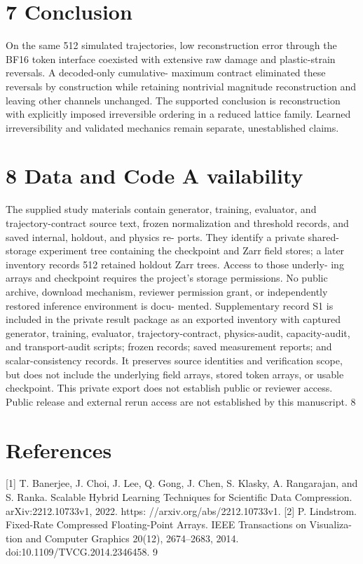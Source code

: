 \documentclass[11pt]{article}
\begin{document}
\section*{7 Conclusion}

On the same 512 simulated trajectories, low reconstruction error through the BF16 token interface
coexisted with extensive raw damage and plastic-strain reversals. A decoded-only cumulative-
maximum contract eliminated these reversals by construction while retaining nontrivial magnitude
reconstruction and leaving other channels unchanged. The supported conclusion is reconstruction
with explicitly imposed irreversible ordering in a reduced lattice family. Learned irreversibility and
validated mechanics remain separate, unestablished claims.

\section*{8 Data and Code A vailability}

The supplied study materials contain generator, training, evaluator, and trajectory-contract source
text, frozen normalization and threshold records, and saved internal, holdout, and physics re-
ports. They identify a private shared-storage experiment tree containing the checkpoint and Zarr
field stores; a later inventory records 512 retained holdout Zarr trees. Access to those underly-
ing arrays and checkpoint requires the project’s storage permissions. No public archive, download
mechanism, reviewer permission grant, or independently restored inference environment is docu-
mented. Supplementary record S1 is included in the private result package as an exported inventory
with captured generator, training, evaluator, trajectory-contract, physics-audit, capacity-audit, and
transport-audit scripts; frozen records; saved measurement reports; and scalar-consistency records.
It preserves source identities and verification scope, but does not include the underlying field arrays,
stored token arrays, or usable checkpoint. This private export does not establish public or reviewer
access. Public release and external rerun access are not established by this manuscript.
8


\section*{References}

[1] T. Banerjee, J. Choi, J. Lee, Q. Gong, J. Chen, S. Klasky, A. Rangarajan, and S. Ranka. Scalable
Hybrid Learning Techniques for Scientific Data Compression. arXiv:2212.10733v1, 2022. https:
//arxiv.org/abs/2212.10733v1.
[2] P. Lindstrom. Fixed-Rate Compressed Floating-Point Arrays. IEEE Transactions on Visualiza-
tion and Computer Graphics 20(12), 2674–2683, 2014. doi:10.1109/TVCG.2014.2346458.
9
\end{document}
